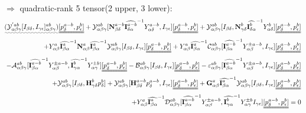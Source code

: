 \documentclass{Note}
\begin{document}
$\Rightarrow$ quadratic-rank 5 tensor(2 upper, 3 lower):
\begin{equation}
\begin{aligned}
\uwave{(\mathcal{Y}_{\alpha\beta\gamma}^{'ab}[I_{\beta\delta},I_{\gamma\epsilon}]_{\alpha\beta\gamma}^{ab})}
\uuline{[p_{\delta}^{a-b}, p_{\epsilon}^{b}]}+\mathcal{Y}_{\alpha\beta\gamma}^{ab}[\textbf{N}_{\beta\delta}^{a-b} {\widehat{\textbf{I}_{\delta \alpha}^{a-b}}}^{-1}  Y_{\alpha\delta}^{a-b} ,I_{\gamma\epsilon} ]\uuline{[p_{\delta}^{a-b}, p_{\epsilon}^{b}]}+\mathcal{Y}_{\alpha\beta\gamma}^{ab}[I_{\beta\delta},\textbf{N}_{\gamma\delta}^{b} {\widehat{\textbf{I}_{\delta \alpha}^{b}}}^{-1}  Y_{\alpha\delta}^{b} ]\uuline{[p_{\delta}^{a-b}, p_{\epsilon}^{b}]}\\
+Y_{\alpha\beta}^{a} {\widehat{\textbf{I}_{\beta \alpha}^a}}^{-1}   \textbf{N}_{\alpha\beta}^a {\widehat{\textbf{I}_{\beta \alpha}^a}}^{-1} \mathcal{Y}_{\alpha\beta\gamma}^{ab}[I_{\beta\delta},I_{\gamma\epsilon} ]\uuline{[p_{\delta}^{a-b}, p_{\epsilon}^{b}] }+Y_{\alpha\beta}^{a}{\widehat{\textbf{I}_{\beta \alpha}^a}}^{-1}  \mathcal{C}_{\alpha\beta\gamma}^{ab}[{\widehat{\textbf{I}_{\beta \alpha}^{a-b}}}^{-1}  Y_{\alpha\beta}^{\pm a-b} ,I_{\gamma\epsilon} ]\uuline{[p_{\delta}^{a-b}, p_{\epsilon}^{b}]}\\
-\mathcal{A}_{\alpha\beta\gamma}^{ab}[{\widehat{\textbf{I}_{\beta \alpha}^{a-b}}}^{-1}  Y_{\alpha\beta}^{\pm a-b} ,{\widehat{\textbf{I}_{\gamma \alpha}^{b}}}^{-1}  Y_{\alpha\gamma}^{\pm b} ]\uuline{[p_{\delta}^{a-b}, p_{\epsilon}^{b}]} -\mathcal{B}_{\alpha\beta\gamma}^{ab}[I_{\beta\delta},I_{\gamma\epsilon} ]\uuline{[p_{\delta}^{a-b}, p_{\epsilon}^{b}]}-\varepsilon_{\alpha\beta\gamma}^{ab}[{\widehat{\textbf{I}_{\beta \alpha}^{a-b}}}^{-1}  Y_{\alpha\beta}^{\pm a-b}  ,I_{\gamma\epsilon} ]\uuline{[p_{\delta}^{a-b}, p_{\epsilon}^{b}]}\\
+\mathcal{Y}_{\alpha\beta\gamma}^{ab}[I_{\beta\delta},\textbf{H}_{\gamma\delta}^{b} p_{\delta}^{b}]+\mathcal{Y}_{\alpha\beta\gamma}^{ab}[\textbf{H}_{\beta\delta}^{a-b} p_{\delta}^{a-b},I_{\gamma\epsilon} ]\uuline{[p_{\delta}^{a-b}, p_{\epsilon}^{b}]}+\textbf{G}_{\alpha\beta}^a  {\widehat{\textbf{I}_{\beta \alpha}^a}}^{-1} \mathcal{Y}_{\alpha\beta\gamma}^{ab}[I_{\beta\delta},I_{\gamma\epsilon} ] \uuline{[p_{\delta}^{a-b}, p_{\epsilon}^{b}]}\\
+Y_{\alpha\beta}^{a} {\widehat{\textbf{I}_{\beta \alpha}^a}}^{-1}  \mathcal{D}_{\alpha\beta\gamma}^{ab}[{\widehat{\textbf{I}_{\beta \alpha}^{a-b}}}^{-1}  Y_{\alpha\beta}^{\pm a-b} ,{\widehat{\textbf{I}_{\gamma \alpha}^{b}}}^{-1}  Y_{\alpha\gamma}^{\pm b} I_{\gamma\epsilon} ]\uuline{[p_{\delta}^{a-b}, p_{\epsilon}^{b}]}=0
\end{aligned}
\end{equation}
\end{document}
